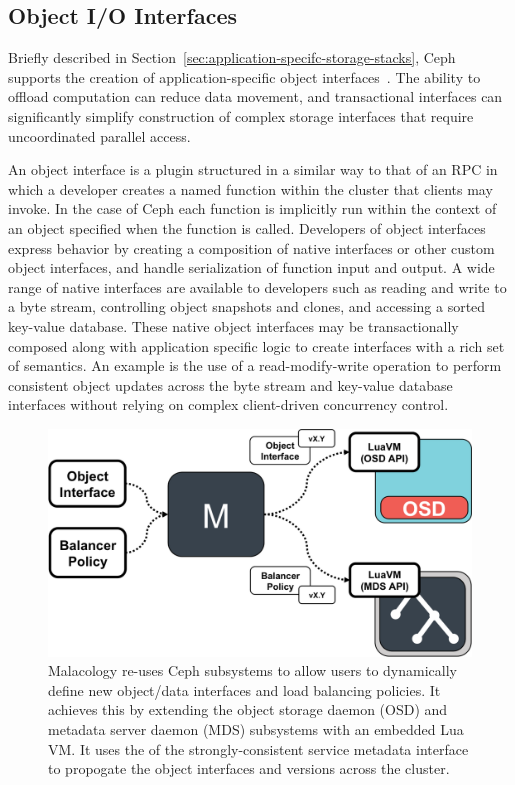 \documentclass[preprint]{sigplanconf-eurosys}
\begin{document}
\subsection{Object I/O Interfaces}
\label{object-data-interface}

Briefly described in Section~\ref{sec:application-specifc-storage-stacks}, Ceph
supports the creation of application-specific object
interfaces~\cite{weil_rados_2007}. The ability to offload computation can
reduce data movement, and transactional interfaces can significantly simplify
construction of complex storage interfaces that require uncoordinated parallel
access. 

An object interface is a plugin structured in a similar way to that of an RPC
in which a developer creates a named function within the cluster that clients
may invoke. In the case of Ceph each function is implicitly run within the
context of an object specified when the function is called. Developers of
object interfaces express behavior by creating a composition of native
interfaces or other custom object interfaces, and handle serialization of
function input and output.  A wide range of native interfaces are available to
developers such as reading and write to a byte stream, controlling object
snapshots and clones, and accessing a sorted key-value database. These native
object interfaces may be transactionally composed along with application
specific logic to create interfaces with a rich set of semantics.  An example
is the use of a read-modify-write operation to perform consistent object
updates across the byte stream and key-value database interfaces without
relying on complex client-driven concurrency control.

\begin{figure}[htbp]
\centering
\includegraphics{figures/implementation.png}
\caption{Malacology re-uses Ceph subsystems to allow users to dynamically
define new object/data interfaces and load balancing policies. It achieves this
by extending the object storage daemon (OSD) and metadata server daemon (MDS)
subsystems with an embedded Lua VM.  It uses the of the strongly-consistent
service metadata interface to propogate the object interfaces and versions
across the cluster.
\label{fig:implementation}} \end{figure}
\end{document}
